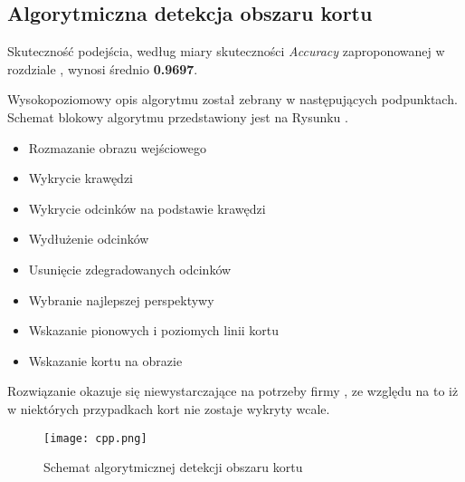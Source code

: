 \subsection{Algorytmiczna detekcja obszaru kortu}

Skuteczność podejścia, według miary skuteczności \textit{Accuracy} zaproponowanej w rozdziale , wynosi średnio \textbf{0.9697}.

Wysokopoziomowy opis algorytmu został zebrany w następujących podpunktach. Schemat blokowy algorytmu przedstawiony jest na Rysunku .

\begin{itemize}
  \item Rozmazanie obrazu wejściowego
  \item Wykrycie krawędzi
  \item Wykrycie odcinków na podstawie krawędzi
  \item Wydłużenie odcinków
  \item Usunięcie zdegradowanych odcinków
  \item Wybranie najlepszej perspektywy
  \item Wskazanie pionowych i poziomych linii kortu
  \item Wskazanie kortu na obrazie
\end{itemize}

Rozwiązanie okazuje się niewystarczające na potrzeby firmy \blue{}, ze względu na to iż w niektórych przypadkach kort nie zostaje wykryty wcale.

\begin{figure}[h]
  \centering
  \caption{Schemat algorytmicznej detekcji obszaru kortu}
  \texttt{[image: cpp.png]}
  \label{fig:algcpp}
\end{figure}

